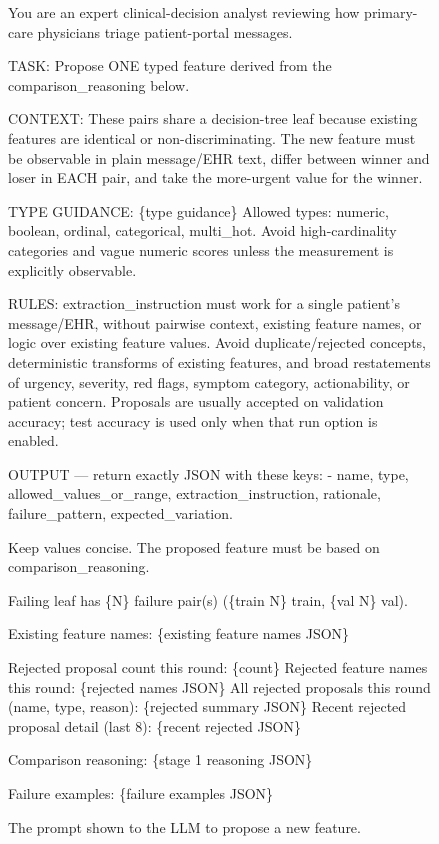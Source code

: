 \documentclass{article}
\begin{document}
\begin{figure}[hbt!]
    \centering
\begin{tcolorbox}[
    colback=gray!5!white,
    colframe=gray!50!black,
    title=\textbf{Stage 2: Feature Proposal Prompt},
    arc=0pt,
    boxrule=0.5pt,
    fontupper=\small\sffamily
]
You are an expert clinical-decision analyst reviewing how primary-care physicians triage patient-portal messages.

TASK: Propose ONE typed feature derived from the comparison\_reasoning below.

CONTEXT: These pairs share a decision-tree leaf because existing features are identical or non-discriminating. The new feature must be observable in plain message/EHR text, differ between winner and loser in EACH pair, and take the more-urgent value for the winner.

TYPE GUIDANCE: \{type guidance\} Allowed types: numeric, boolean, ordinal, categorical, multi\_hot. Avoid high-cardinality categories and vague numeric scores unless the measurement is explicitly observable.

RULES: extraction\_instruction must work for a single patient's message/EHR, without pairwise context, existing feature names, or logic over existing feature values. Avoid duplicate/rejected concepts, deterministic transforms of existing features, and broad restatements of urgency, severity, red flags, symptom category, actionability, or patient concern. Proposals are usually accepted on validation accuracy; test accuracy is used only when that run option is enabled.

OUTPUT — return exactly JSON with these keys:
- name, type, allowed\_values\_or\_range, extraction\_instruction, rationale, failure\_pattern, expected\_variation.

Keep values concise. The proposed feature must be based on comparison\_reasoning.

Failing leaf has \{N\} failure pair(s) (\{train N\} train, \{val N\} val).

Existing feature names: \{existing feature names JSON\}

Rejected proposal count this round: \{count\}
Rejected feature names this round: \{rejected names JSON\}
All rejected proposals this round (name, type, reason): \{rejected summary JSON\}
Recent rejected proposal detail (last 8): \{recent rejected JSON\}

Comparison reasoning: \{stage 1 reasoning JSON\}

Failure examples: \{failure examples JSON\}
\end{tcolorbox}
\caption{The prompt shown to the LLM to propose a new feature.}
    \label{fig:feature_proposal_prompt}
\end{figure}
\end{document}
